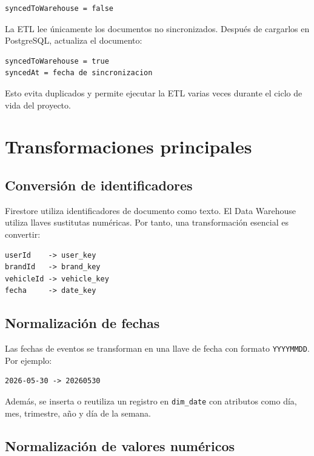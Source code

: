 \documentclass[12pt,letterpaper]{article}
\begin{document}
\begin{lstlisting}[style=textstyle]
syncedToWarehouse = false
\end{lstlisting}

La ETL lee únicamente los documentos no sincronizados. Después de cargarlos en PostgreSQL, actualiza el documento:

\begin{lstlisting}[style=textstyle]
syncedToWarehouse = true
syncedAt = fecha de sincronizacion
\end{lstlisting}

Esto evita duplicados y permite ejecutar la ETL varias veces durante el ciclo de vida del proyecto.

\section{Transformaciones principales}

\subsection{Conversión de identificadores}

Firestore utiliza identificadores de documento como texto. El Data Warehouse utiliza llaves sustitutas numéricas. Por tanto, una transformación esencial es convertir:

\begin{lstlisting}[style=textstyle]
userId    -> user_key
brandId   -> brand_key
vehicleId -> vehicle_key
fecha     -> date_key
\end{lstlisting}

\subsection{Normalización de fechas}

Las fechas de eventos se transforman en una llave de fecha con formato \texttt{YYYYMMDD}. Por ejemplo:

\begin{lstlisting}[style=textstyle]
2026-05-30 -> 20260530
\end{lstlisting}

Además, se inserta o reutiliza un registro en \texttt{dim\_date} con atributos como día, mes, trimestre, año y día de la semana.

\subsection{Normalización de valores numéricos}
\end{document}
